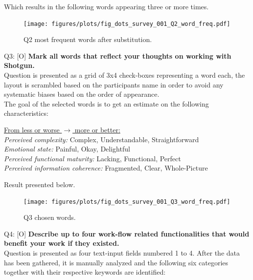   Which results in the following words appearing three or more times.

  \begin{figure}[H]
    \centering
    \texttt{[image: figures/plots/fig\_dots\_survey\_001\_Q2\_word\_freq.pdf]}
    \caption{Q2 most frequent words after substitution.}
  \end{figure}

  Q3: [O] \textbf{%
    Mark all words that reflect your thoughts on working with \\Shotgun.
  } \\
    Question is presented as a grid of 3x4 check-boxes representing a word each,
    the layout is scrambled based on the participants name in order to avoid any
    systematic biases based on the order of appearance. \\

    The goal of the selected words is to get an estimate on the following
    characteristics: \\
    \begin{adjustwidth}{0.5cm}{}
      \underline{From less or worse $\longrightarrow$ more or better:} \\
      \textit{Perceived complexity:} Complex, Understandable, Straightforward \\
      \textit{Emotional state:} Painful, Okay, Delightful \\
      \textit{Perceived functional maturity:} Lacking, Functional, Perfect \\
      \textit{Perceived information coherence:} Fragmented, Clear, Whole-Picture \\
    \end{adjustwidth}

    Result presented below.

    \begin{figure}[H]
      \centering
      \hspace{-2.35cm}
      \texttt{[image: figures/plots/fig\_dots\_survey\_001\_Q3\_word\_freq.pdf]}
      \caption{Q3 chosen words.}
    \end{figure}

  Q4: [O] \textbf{%
    Describe up to four work-flow related functionalities that would benefit
    your work if they existed.
  } \\

    Question is presented as four text-input fields numbered 1 to 4.
    After the data has been gathered, it is manually analyzed and the following
    six categories together with their respective keywords are identified:

